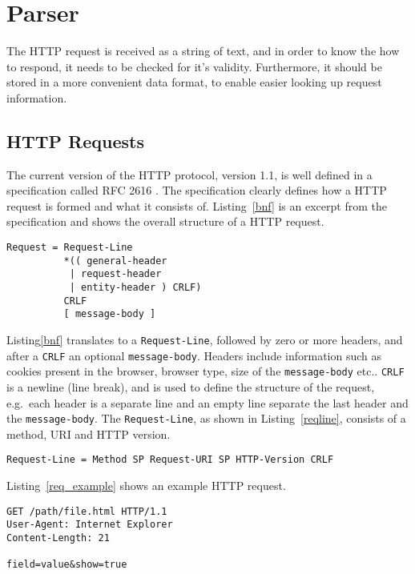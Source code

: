 \section{Parser}

The HTTP request is received as a string of text, and in order to know the how
to respond, it needs to be checked for it's validity. Furthermore, it should
be stored in a more convenient data format, to enable easier looking up
request information.

\subsection{HTTP Requests}
The current version of the HTTP protocol, version 1.1, is well defined in a
specification called RFC 2616 \cite{rfc}. The specification clearly defines how
a HTTP request is formed and what it consists of. Listing~\ref{bnf} is an
excerpt from the specification and shows the overall structure of a HTTP
request.

\bigskip
\begin{lstlisting}[label=bnf,caption=HTTP request structure]
Request = Request-Line
          *(( general-header
           | request-header
           | entity-header ) CRLF)
          CRLF
          [ message-body ]
\end{lstlisting}

Listing\ref{bnf} translates to a \texttt{Request-Line}, followed by zero or
more headers, and after a \texttt{CRLF} an optional \texttt{message-body}.
Headers include information such as cookies present in the browser, browser
type, size of the \texttt{message-body} etc.. \texttt{CRLF} is a newline (line
break), and is used to define the structure of the request, e.g.\ each
header is a separate line and an empty line separate the last header and the
\texttt{message-body}. The \texttt{Request-Line}, as shown in
Listing~\ref{reqline}, consists of a method, URI and HTTP version.

\bigskip
\begin{lstlisting}[label=reqline,caption=HTTP Request-Line]
Request-Line = Method SP Request-URI SP HTTP-Version CRLF
\end{lstlisting}

Listing~\ref{req_example} shows an example HTTP request.

\bigskip
\begin{lstlisting}[label=req_example,caption=Example HTTP request]
GET /path/file.html HTTP/1.1
User-Agent: Internet Explorer
Content-Length: 21

field=value&show=true
\end{lstlisting}

